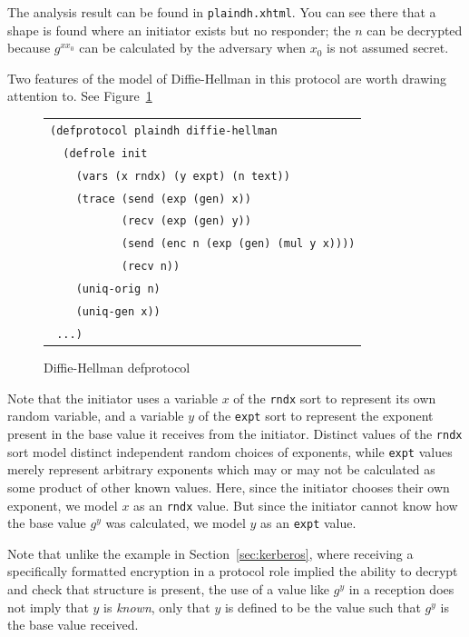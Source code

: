 The analysis result can be found in \texttt{plaindh.xhtml}.  You can see
there that a shape is found where an initiator exists but no
responder; the $n$ can be decrypted because $g^{x x_0}$ can be
calculated by the adversary when $x_0$ is not assumed secret.

Two features of the {\cpsa} model of Diffie-Hellman in this protocol are
worth drawing attention to.  See Figure~\ref{fig:plaindh defprotocol}

\begin{figure}
\begin{center}
\begin{tabular}{l}
\verb|(defprotocol plaindh diffie-hellman|\\
\verb|  (defrole init|\\
\verb|    (vars (x rndx) (y expt) (n text))|\\
\verb|    (trace (send (exp (gen) x))|\\
\verb|           (recv (exp (gen) y)) |\\
\verb|           (send (enc n (exp (gen) (mul y x))))|\\
\verb|           (recv n))|\\
\verb|    (uniq-orig n)|\\
\verb|    (uniq-gen x))|\\
\verb| ...)|
\end{tabular}
\end{center}
\caption{Diffie-Hellman defprotocol}
\label{fig:plaindh defprotocol}
\end{figure}

 
Note that the initiator uses a variable $x$ of the \texttt{rndx} sort
to represent its own random variable, and a variable $y$ of the
\texttt{expt} sort to represent the exponent present in the base value
it receives from the initiator.  Distinct values of the \texttt{rndx}
sort model distinct independent random choices of exponents, while
\texttt{expt} values merely represent arbitrary exponents which may or
may not be calculated as some product of other known values.  Here,
since the initiator chooses their own exponent, we model $x$ as an
\texttt{rndx} value.  But since the initiator cannot know how the base value
$g^y$ was calculated, we model $y$ as an \texttt{expt} value.

Note that unlike the example in Section~\ref{sec:kerberos},
where receiving a specifically formatted encryption in a protocol role
implied the ability to decrypt and check that structure is present,
the use of a value like $g^y$ in a reception does not imply that $y$
is \emph{known}, only that $y$ is defined to be the value such that
$g^y$ is the base value received.

